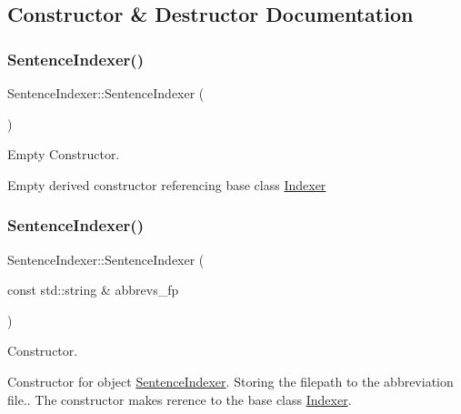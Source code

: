 \subsection{Constructor \& Destructor Documentation}
\mbox{\label{class_sentence_indexer_a2ec9f359954191ebc5d84c759fd2238d}} 
\subsubsection{\texorpdfstring{Sentence\+Indexer()}{SentenceIndexer()}\hspace{0.1cm}{\footnotesize\ttfamily [1/2]}}
{\footnotesize\ttfamily Sentence\+Indexer\+::\+Sentence\+Indexer (\begin{DoxyParamCaption}{ }\end{DoxyParamCaption})\hspace{0.3cm}{\ttfamily [inline]}}



Empty Constructor. 

Empty derived constructor referencing base class \hyperlink{class_indexer}{Indexer} \mbox{\label{class_sentence_indexer_a65a376d016bd9ff8a9f7c1f8521f2a1f}} 
\subsubsection{\texorpdfstring{Sentence\+Indexer()}{SentenceIndexer()}\hspace{0.1cm}{\footnotesize\ttfamily [2/2]}}
{\footnotesize\ttfamily Sentence\+Indexer\+::\+Sentence\+Indexer (\begin{DoxyParamCaption}\item[{const std\+::string \&}]{abbrevs\+\_\+fp }\end{DoxyParamCaption})\hspace{0.3cm}{\ttfamily [inline]}}



Constructor. 

Constructor for object \hyperlink{class_sentence_indexer}{Sentence\+Indexer}. Storing the filepath to the abbreviation file.. The constructor makes rerence to the base class \hyperlink{class_indexer}{Indexer}. 

